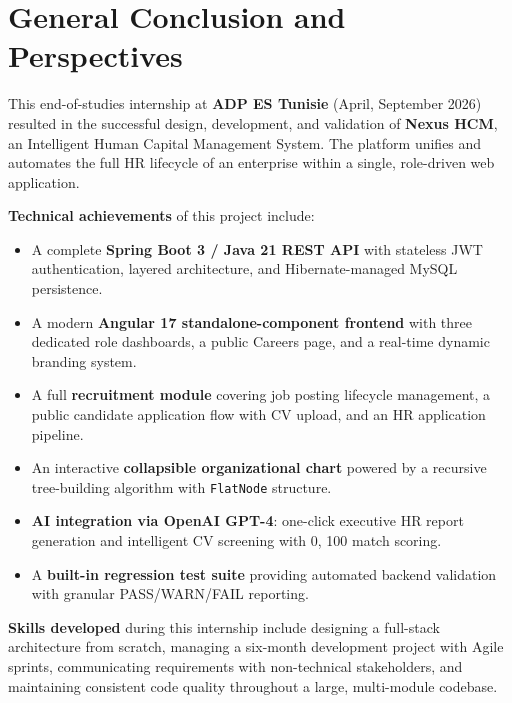 \documentclass[12pt,a4paper]{report}
\begin{document}
\newpage

\chapter*{General Conclusion and Perspectives}

This end-of-studies internship at \textbf{ADP ES Tunisie} (April, September 2026)
resulted in the successful design, development, and validation of \textbf{Nexus HCM},
an Intelligent Human Capital Management System. The platform unifies and automates
the full HR lifecycle of an enterprise within a single, role-driven web application.

\textbf{Technical achievements} of this project include:

\begin{itemize}
  \item A complete \textbf{Spring Boot 3 / Java 21 REST API} with stateless JWT
    authentication, layered architecture, and Hibernate-managed MySQL persistence.
  \item A modern \textbf{Angular 17 standalone-component frontend} with three dedicated
    role dashboards, a public Careers page, and a real-time dynamic branding system.
  \item A full \textbf{recruitment module} covering job posting lifecycle management,
    a public candidate application flow with CV upload, and an HR application pipeline.
  \item An interactive \textbf{collapsible organizational chart} powered by a recursive
    tree-building algorithm with \texttt{FlatNode} structure.
  \item \textbf{AI integration via OpenAI GPT-4}: one-click executive HR report
    generation and intelligent CV screening with 0, 100 match scoring.
  \item A \textbf{built-in regression test suite} providing automated backend validation
    with granular PASS/WARN/FAIL reporting.
\end{itemize}

\textbf{Skills developed} during this internship include designing a full-stack
architecture from scratch, managing a six-month development project with Agile sprints,
communicating requirements with non-technical stakeholders, and maintaining consistent
code quality throughout a large, multi-module codebase.
\end{document}
